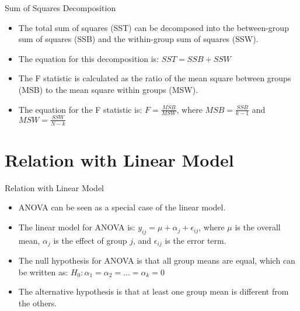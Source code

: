 \documentclass{beamer}
\begin{document}
\begin{frame}{Sum of Squares Decomposition}
  \begin{itemize}
      \item The total sum of squares (SST) can be decomposed into the between-group sum of squares (SSB) and the within-group sum of squares (SSW).
      \item The equation for this decomposition is: $SST = SSB + SSW$
      \item The F statistic is calculated as the ratio of the mean square between groups (MSB) to the mean square within groups (MSW).
      \item The equation for the F statistic is: $F = \frac{MSB}{MSW}$, where $MSB = \frac{SSB}{k-1}$ and $MSW = \frac{SSW}{N-k}$
  \end{itemize}
\end{frame}

\section{Relation with Linear Model}
\begin{frame}{Relation with Linear Model}
  \begin{itemize}
      \item ANOVA can be seen as a special case of the linear model.
      \item The linear model for ANOVA is: $y_{ij} = \mu + \alpha_j + \epsilon_{ij}$, where $\mu$ is the overall mean, $\alpha_j$ is the effect of group $j$, and $\epsilon_{ij}$ is the error term.
      \item The null hypothesis for ANOVA is that all group means are equal, which can be written as: $H_0: \alpha_1 = \alpha_2 = ... = \alpha_k = 0$
      \item The alternative hypothesis is that at least one group mean is different from the others.
  \end{itemize}
\end{frame}
\end{document}
